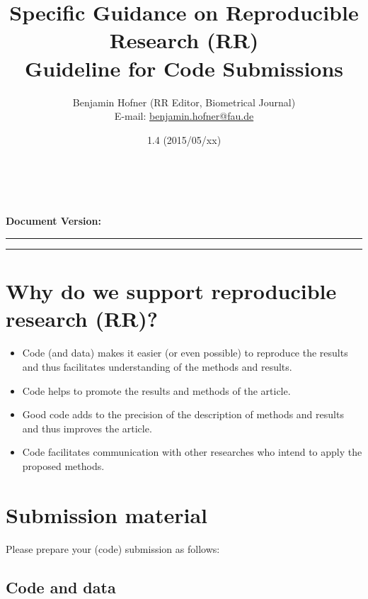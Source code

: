 \documentclass[12pt,a4paper]{article}
\title{Specific Guidance on Reproducible Research (RR)\\[0.2em]
  \large Guideline for Code Submissions}
\author{Benjamin Hofner (RR Editor, Biometrical Journal)\\
  E-mail: \href{mailto:benjamin.hofner@fau.de}{benjamin.hofner@fau.de}}
\date{1.4 (2015/05/xx)}
\makeatletter
\renewcommand{\maketitle}{\bgroup\setlength{\parindent}{0pt}
  \begin{flushleft}
    \vspace*{2cm}
    \textbf{\Large \@title}\\[1em]

    \@author\\[0.5em]

    \textbf{Document Version:} \@date
    \vspace{2em}
  \end{flushleft}\egroup
}
\makeatother
\begin{document}
\maketitle

\hrule

\tableofcontents

\vspace{2em}
\hrule
\vspace{0.5cm}

\setlength{\parskip}{0.2em}

\section*{Why do we support reproducible research (RR)?}
\begin{itemize}
\item Code (and data) makes it easier (or even possible) to reproduce the results
  and thus facilitates understanding of the methods and results.
\item Code helps to promote the results and methods of the article.
\item Good code adds to the precision of the description of methods and results
  and thus improves the article.
\item Code facilitates communication with other researches who intend to apply
  the proposed methods.
\end{itemize}

\newpage
\setcounter{section}{0}

\section{Submission material}

Please prepare your (code) submission as follows:

\subsection{Code and data}
\end{document}
